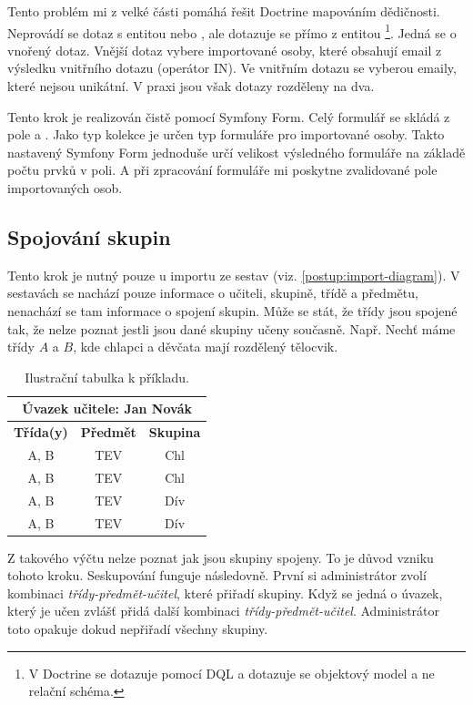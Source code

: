 Tento problém mi z velké části pomáhá řešit Doctrine mapováním dědičnosti.
Neprovádí se dotaz s entitou  nebo , ale dotazuje se přímo z entitou \footnote{V Doctrine se dotazuje pomocí DQL a dotazuje se objektový model a ne relační schéma.}.
Jedná se o vnořený dotaz.
Vnější dotaz vybere importované osoby, které obsahují email z výsledku vnitřního dotazu (operátor \textsc{IN}).
Ve vnitřním dotazu se vyberou emaily, které nejsou unikátní. V praxi jsou však dotazy rozděleny na dva.

Tento krok je realizován čistě pomocí Symfony Form. Celý formulář se skládá z pole  a .
  Jako typ kolekce je určen typ formuláře pro importované osoby. Takto nastavený Symfony Form jednoduše určí velikost výsledného formuláře na základě počtu prvků v poli. A při zpracování formuláře mi poskytne zvalidované pole importovaných osob.

\subsection{Spojování skupin}\label{postup:spojovani-skupin}

Tento krok je nutný pouze u importu ze sestav (viz. \ref{postup:import-diagram}).
V sestavách se nachází pouze informace o učiteli, skupině, třídě a předmětu, nenachází se tam informace o spojení skupin.
Může se stát, že třídy jsou spojené tak, že nelze poznat jestli jsou dané skupiny učeny současně.
Např. Nechť máme třídy $A$ a $B$, kde chlapci a děvčata mají rozdělený tělocvik.

\begin{table}[h!]
\centering
\begin{tabular}{ | c | c | c | }
\hline
 \multicolumn{3}{|c|}{\textbf{Úvazek učitele:} Jan Novák}\\
     \hline
 \textbf{Třída(y)} & \textbf{Předmět} & \textbf{Skupina}\\
 \hline
 A, B & TEV & Chl \\ 
 \hline
 A, B & TEV & Chl \\  
 \hline
 A, B & TEV & Dív \\ 
 \hline
 A, B & TEV & Dív \\  
 \hline
\end{tabular}
\caption{Ilustrační tabulka k příkladu.}
\end{table}

Z takového výčtu nelze poznat jak jsou skupiny spojeny.
To je důvod vzniku tohoto kroku.
Seskupování funguje následovně.
První si administrátor zvolí kombinaci \textit{třídy-předmět-učitel}, které přiřadí skupiny. 
Když se jedná o úvazek, který je učen zvlášť přidá další kombinaci \textit{třídy-předmět-učitel}. Administrátor toto opakuje dokud nepřiřadí všechny skupiny.

